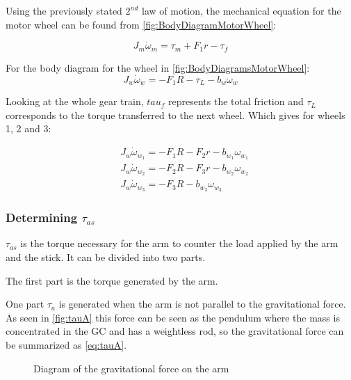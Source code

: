 Using the previously stated $2^{nd}$ law of motion, the mechanical equation for the motor wheel can be found from \autoref{fig:BodyDiagramMotorWheel}:

\begin{equation}
    J_m \dot{\omega}_m = \tau_m + F_1r - \tau_f
\end{equation}

For the body diagram for the wheel in \autoref{fig:BodyDiagramsMotorWheel}:
\begin{equation}
	J_w\dot{\omega}_w = -F_1R -\tau_L -b_w\omega_w
\end{equation}

Looking at the whole gear train, $tau_f$ represents the total friction and $\tau_L$ corresponds to the torque transferred to the next wheel. Which gives for wheels 1, 2 and 3:

\begin{subequations} 
	\begin{flalign}
		&J_w\dot{\omega}_{w_1} = -F_1R -F_2r -b_{w_1}\omega_{w_1} \\
		&J_w\dot{\omega}_{w_2} = -F_2R -F_3r -b_{w_2}\omega_{w_2} \\
		&J_w\dot{\omega}_{w_3}= -F_3R -b_{w_3}\omega_{w_3}
	\end{flalign}
\end{subequations}



\subsubsection*{Determining $\tau_{as}$}

$\tau_{as}$ is the torque necessary for the arm to counter the load applied by the arm and the stick. It can be divided into two parts.

The first part is the torque generated by the arm.

 One part $\tau_a$ is generated when the arm is not parallel to the gravitational force. As seen in \autoref{fig:tauA} this force can be seen as the pendulum where the mass is concentrated in the GC and has a weightless rod, so the gravitational force can be summarized as \autoref{eq:tauA}.

\begin{figure}[htbp]
	\caption{Diagram of the gravitational force on the arm}\label{fig:tauA}
\end{figure}

